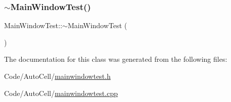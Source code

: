 \mbox{\label{class_main_window_test_a59ff7d75abec3c73ff356ca606893e6d}} 
\subsubsection{\texorpdfstring{$\sim$\+Main\+Window\+Test()}{~MainWindowTest()}}
{\footnotesize\ttfamily Main\+Window\+Test\+::$\sim$\+Main\+Window\+Test (\begin{DoxyParamCaption}{ }\end{DoxyParamCaption})}



The documentation for this class was generated from the following files\+:\begin{DoxyCompactItemize}
\item 
Code/\+Auto\+Cell/\mbox{\hyperlink{mainwindowtest_8h}{mainwindowtest.\+h}}\item 
Code/\+Auto\+Cell/\mbox{\hyperlink{mainwindowtest_8cpp}{mainwindowtest.\+cpp}}\end{DoxyCompactItemize}

